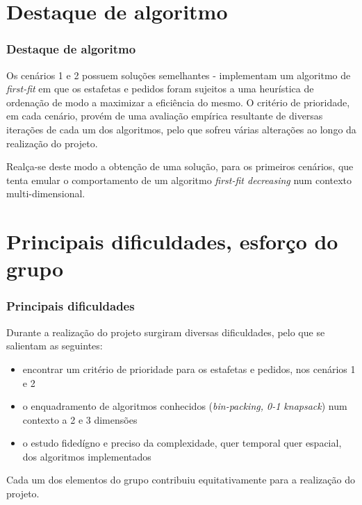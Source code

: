 \documentclass{beamer}
\begin{document}

\section{Destaque de algoritmo}

\begin{frame}[fragile]
\frametitle{Destaque de algoritmo}
Os cenários 1 e 2 possuem soluções semelhantes - implementam um algoritmo de \textit{first-fit} em que os estafetas e pedidos foram sujeitos a uma heurística de ordenação de modo a maximizar a eficiência do mesmo.
O critério de prioridade, em cada cenário, provém de uma avaliação empírica resultante de diversas iterações de cada um dos algoritmos, pelo 
que sofreu várias alterações ao longo da realização do projeto.

Realça-se deste modo a obtenção de uma solução, para os primeiros cenários, que tenta emular o comportamento de um algoritmo \textit{first-fit decreasing} num contexto multi-dimensional.
\end{frame}







\section{Principais dificuldades, esforço do grupo}

\begin{frame}
\frametitle{Principais dificuldades}
Durante a realização do projeto surgiram diversas dificuldades, pelo que se salientam as seguintes:
\begin{itemize}
  \item encontrar um critério de prioridade para os estafetas e pedidos, nos cenários 1 e 2
  \item o enquadramento de algoritmos conhecidos (\textit{bin-packing, 0-1 knapsack}) num contexto a 2 e 3 dimensões
  \item o estudo fidedígno e preciso da complexidade, quer temporal quer espacial, dos algoritmos implementados
\end{itemize}
Cada um dos elementos do grupo contribuiu equitativamente para a realização do projeto.
\end{frame}
\end{document}
